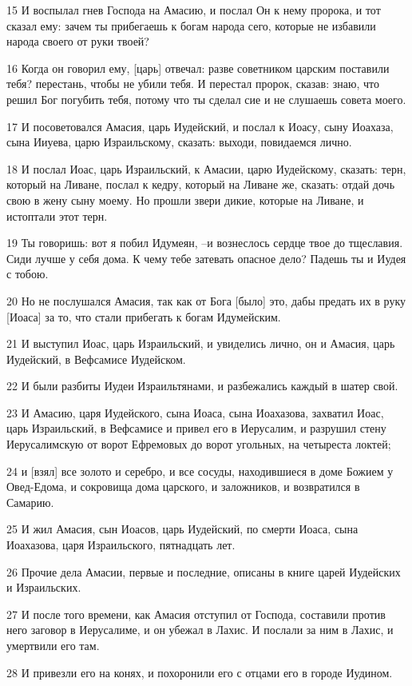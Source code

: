 \par 15 И воспылал гнев Господа на Амасию, и послал Он к нему пророка, и тот сказал ему: зачем ты прибегаешь к богам народа сего, которые не избавили народа своего от руки твоей?
\par 16 Когда он говорил ему, [царь] отвечал: разве советником царским поставили тебя? перестань, чтобы не убили тебя. И перестал пророк, сказав: знаю, что решил Бог погубить тебя, потому что ты сделал сие и не слушаешь совета моего.
\par 17 И посоветовался Амасия, царь Иудейский, и послал к Иоасу, сыну Иоахаза, сына Ииуева, царю Израильскому, сказать: выходи, повидаемся лично.
\par 18 И послал Иоас, царь Израильский, к Амасии, царю Иудейскому, сказать: терн, который на Ливане, послал к кедру, который на Ливане же, сказать: отдай дочь свою в жену сыну моему. Но прошли звери дикие, которые на Ливане, и истоптали этот терн.
\par 19 Ты говоришь: вот я побил Идумеян, --и вознеслось сердце твое до тщеславия. Сиди лучше у себя дома. К чему тебе затевать опасное дело? Падешь ты и Иудея с тобою.
\par 20 Но не послушался Амасия, так как от Бога [было] это, дабы предать их в руку [Иоаса] за то, что стали прибегать к богам Идумейским.
\par 21 И выступил Иоас, царь Израильский, и увиделись лично, он и Амасия, царь Иудейский, в Вефсамисе Иудейском.
\par 22 И были разбиты Иудеи Израильтянами, и разбежались каждый в шатер свой.
\par 23 И Амасию, царя Иудейского, сына Иоаса, сына Иоахазова, захватил Иоас, царь Израильский, в Вефсамисе и привел его в Иерусалим, и разрушил стену Иерусалимскую от ворот Ефремовых до ворот угольных, на четыреста локтей;
\par 24 и [взял] все золото и серебро, и все сосуды, находившиеся в доме Божием у Овед-Едома, и сокровища дома царского, и заложников, и возвратился в Самарию.
\par 25 И жил Амасия, сын Иоасов, царь Иудейский, по смерти Иоаса, сына Иоахазова, царя Израильского, пятнадцать лет.
\par 26 Прочие дела Амасии, первые и последние, описаны в книге царей Иудейских и Израильских.
\par 27 И после того времени, как Амасия отступил от Господа, составили против него заговор в Иерусалиме, и он убежал в Лахис. И послали за ним в Лахис, и умертвили его там.
\par 28 И привезли его на конях, и похоронили его с отцами его в городе Иудином.

